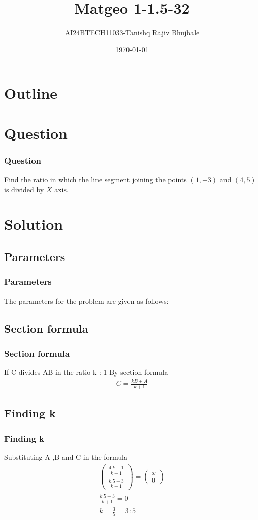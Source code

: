 \documentclass{beamer}
\title{Matgeo 1-1.5-32}
\author{AI24BTECH11033-Tanishq Rajiv Bhujbale}
\date{\today}
\providecommand{\brak}[1]{\ensuremath{\left(#1\right)}}
\theoremstyle{remark}
\newcommand{\myvec}[1]{\ensuremath{\begin{pmatrix}#1\end{pmatrix}}}
\numberwithin{equation}{section}
\begin{document}
\begin{frame}
\titlepage
\end{frame}

\section*{Outline}
\begin{frame}
\tableofcontents
\end{frame}

\section{Question}
\begin{frame}
\frametitle{Question}

Find the ratio in which the line segment joining the points $\brak{1,-3}$ and $\brak{4, 5}$ is divided by $X$ axis.
\\
\end{frame}

\section{Solution}
\subsection{Parameters}
\begin{frame}
\frametitle{Parameters}
The parameters for the problem are given as follows:
\begin{table}[h]
    \centering
    
\end{table}
\end{frame}

\subsection{Section formula}
\begin{frame}
\frametitle{Section formula}
If C divides AB in the ratio k : 1
By section formula
\begin{align*}
C=\frac{kB+A}{k+1}
\end{align*}
\end{frame}

\subsection{Finding k}
\begin{frame}
\frametitle{Finding k}
Substituting A ,B and C in the formula 
	\begin{align*}
	\myvec{ \frac{4.k+1}{k+1}\\ \frac{k.5-3}{k+1}} = \myvec{ x \\ 0} \\	 
 \frac{k.5-3}{k+1} = 0 \\
 k=\frac{3}{5}=3:5 
\end{align*}
\end{frame}
\end{document}
